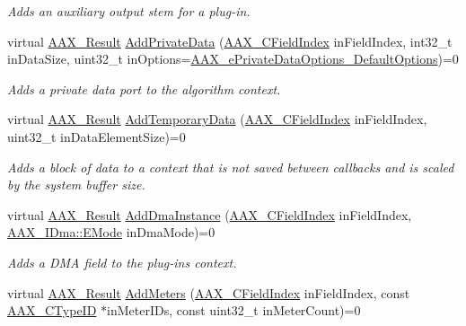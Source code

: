 \begin{DoxyCompactItemize}
\begin{DoxyCompactList}\small\item\em Adds an auxiliary output stem for a plug-\/in. \end{DoxyCompactList}\item 
virtual \mbox{\hyperlink{a00392_a4d8f69a697df7f70c3a8e9b8ee130d2f}{A\+A\+X\+\_\+\+Result}} \mbox{\hyperlink{a01781_a125949841a13e97ff93fa321f2050433}{Add\+Private\+Data}} (\mbox{\hyperlink{a00392_ae807f8986143820cfb5d6da32165c9c7}{A\+A\+X\+\_\+\+C\+Field\+Index}} in\+Field\+Index, int32\+\_\+t in\+Data\+Size, uint32\+\_\+t in\+Options=\mbox{\hyperlink{a00491_a9f1ef2cb64daf30eaf145dfbb8cd0d00a59458e9bf18919c51e59eb2fd6e84a9a}{A\+A\+X\+\_\+e\+Private\+Data\+Options\+\_\+\+Default\+Options}})=0
\begin{DoxyCompactList}\small\item\em Adds a private data port to the algorithm context. \end{DoxyCompactList}\item 
virtual \mbox{\hyperlink{a00392_a4d8f69a697df7f70c3a8e9b8ee130d2f}{A\+A\+X\+\_\+\+Result}} \mbox{\hyperlink{a01781_ad8daad601b60fdbd6134fe0c8faa2fc4}{Add\+Temporary\+Data}} (\mbox{\hyperlink{a00392_ae807f8986143820cfb5d6da32165c9c7}{A\+A\+X\+\_\+\+C\+Field\+Index}} in\+Field\+Index, uint32\+\_\+t in\+Data\+Element\+Size)=0
\begin{DoxyCompactList}\small\item\em Adds a block of data to a context that is not saved between callbacks and is scaled by the system buffer size. \end{DoxyCompactList}\item 
virtual \mbox{\hyperlink{a00392_a4d8f69a697df7f70c3a8e9b8ee130d2f}{A\+A\+X\+\_\+\+Result}} \mbox{\hyperlink{a01781_aff9e1c726bbdf500f2d61b164589744e}{Add\+Dma\+Instance}} (\mbox{\hyperlink{a00392_ae807f8986143820cfb5d6da32165c9c7}{A\+A\+X\+\_\+\+C\+Field\+Index}} in\+Field\+Index, \mbox{\hyperlink{a01809_af8d0f19f2896dd6dbd126b919b24e39b}{A\+A\+X\+\_\+\+I\+Dma\+::\+E\+Mode}} in\+Dma\+Mode)=0
\begin{DoxyCompactList}\small\item\em Adds a D\+MA field to the plug-\/in\textquotesingle{}s context. \end{DoxyCompactList}\item 
virtual \mbox{\hyperlink{a00392_a4d8f69a697df7f70c3a8e9b8ee130d2f}{A\+A\+X\+\_\+\+Result}} \mbox{\hyperlink{a01781_a5e4a61afa3d6510891e16d7179bdaa64}{Add\+Meters}} (\mbox{\hyperlink{a00392_ae807f8986143820cfb5d6da32165c9c7}{A\+A\+X\+\_\+\+C\+Field\+Index}} in\+Field\+Index, const \mbox{\hyperlink{a00392_ac678f9c1fbcc26315d209f71a147a175}{A\+A\+X\+\_\+\+C\+Type\+ID}} $\ast$in\+Meter\+I\+Ds, const uint32\+\_\+t in\+Meter\+Count)=0

\end{DoxyCompactItemize}

